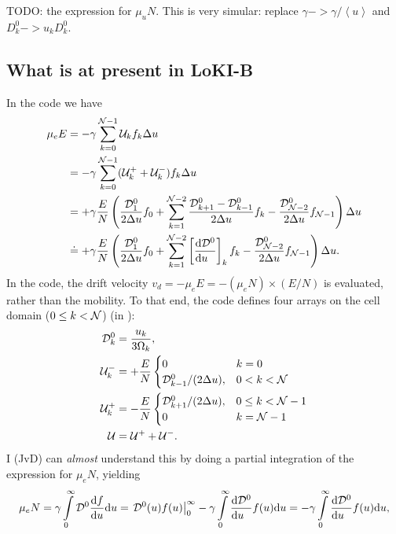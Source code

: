 \documentclass{book}
\newcommand{\MEAN}[1]{\ensuremath{\!\left\langle{{#1}}\right\rangle}}
\begin{document}
TODO: the expression for $\mu_uN$. This is very simular: replace $\gamma -> \gamma/\MEAN{u}$ and $D^0_k->u_kD^0_k$.


\subsection*{What is at present in LoKI-B}

In the code we have
\begin{align}
	\mu_eE
		&= -\gamma \sum\limits_{k=0}^{{\cal N}-1} {\cal U}_kf_k\Delta u \nonumber \\
		&= -\gamma \sum\limits_{k=0}^{{\cal N}-1} ({\cal U}^+_k + {\cal U}^-_k)f_k\Delta u \nonumber \\
		&= +\gamma \frac{E}{N}\left(
			\frac{{\cal D}^0_{1}}{2\Delta u}f_0
			+ \sum\limits_{k=1}^{{\cal N}-2}\frac{{\cal D}^0_{k+1}-{\cal D}^0_{k-1}}{2\Delta u}f_k
			-\frac{{\cal D}^0_{{\cal N}-2}}{2\Delta u}f_{{\cal N}-1}\right)\Delta u \nonumber \\
		&\doteq +\gamma \frac{E}{N}\left(
			\frac{{\cal D}^0_{1}}{2\Delta u}f_0
			+ \sum\limits_{k=1}^{{\cal N}-2}\left[\DERIV{{\cal D}^0}{u}\right]_kf_k
			-\frac{{\cal D}^0_{{\cal N}-2}}{2\Delta u}f_{{\cal N}-1}\right)\Delta u.
\end{align}
In the code, the drift velocity $v_d=-\mu_eE=-(\mu_eN) \times (E/N)$ is evaluated,
rather than the mobility. To that end, the code defines four arrays on the cell
domain ($0\leq k<{\cal N}$) (in ):
\begin{align}
	{\cal D}^0_k &= \frac{u_k}{3\Omega_k}, \\
	{\cal U}^-_k &= +\frac{E}{N}\begin{cases}
				0 & k=0 \\
				{\cal D}^0_{k-1}/(2\Delta u), & 0<k<{\cal N}\\
			\end{cases} \\
	{\cal U}^+_k &= -\frac{E}{N}\begin{cases}
				{\cal D}^0_{k+1}/(2\Delta u), & 0\leq k<{\cal N}-1\\
				0 & k={\cal N}-1 \\
			\end{cases} \\
	{\cal U} &= {\cal U}^+ + {\cal U}^-.
\end{align}
I (JvD) can {\em almost} understand this by doing a partial integration of the expression for $\mu_eN$, yielding
\[
	\mu_eN
		= \gamma\int\limits_0^\infty {\cal D}^0 \DERIV{f}{u}\dd{u}
		= \left. {\cal D}^0(u)f(u)\right|_0^\infty - \gamma\int\limits_0^\infty \DERIV{{\cal D}^0}{u} f(u)\dd{u}
		=  - \gamma\int\limits_0^\infty \DERIV{{\cal D}^0}{u} f(u)\dd{u},
\]
\end{document}
